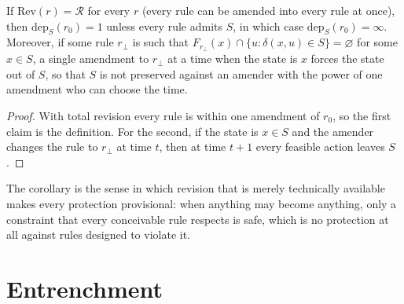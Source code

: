 \begin{newresult}\label{cor:total}
If $\mathrm{Rev}(r)=\mathcal R$ for every $r$ (every rule can be amended into every rule at once), then $\mathrm{dep}_S(r_0)=1$ unless every rule admits $S$, in which case $\mathrm{dep}_S(r_0)=\infty$. Moreover, if some rule $r_{\bot}$ is such that $F_{r_\bot}(x)\cap\{u:\delta(x,u)\in S\}=\varnothing$ for some $x\in S$, a single amendment to $r_\bot$ at a time when the state is $x$ forces the state out of $S$, so that $S$ is not preserved against an amender with the power of one amendment who can choose the time.
\end{newresult}
\begin{proof}
With total revision every rule is within one amendment of $r_0$, so the first claim is the definition. For the second, if the state is $x\in S$ and the amender changes the rule to $r_\bot$ at time $t$, then at time $t+1$ every feasible action leaves $S$.
\end{proof}

The corollary is the sense in which revision that is merely technically available makes every protection provisional: when anything may become anything, only a constraint that every conceivable rule respects is safe, which is no protection at all against rules designed to violate it.

\section{Entrenchment}

